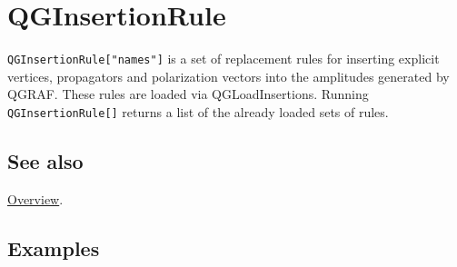 \documentclass[../FeynHelpersManual.tex]{subfiles}
\begin{document}
\hypertarget{qginsertionrule}{
\section{QGInsertionRule}\label{qginsertionrule}}

\texttt{QGInsertionRule[\allowbreak{}"names"]} is a set of replacement
rules for inserting explicit vertices, propagators and polarization
vectors into the amplitudes generated by QGRAF. These rules are loaded
via QGLoadInsertions. Running \texttt{QGInsertionRule[\allowbreak{}]}
returns a list of the already loaded sets of rules.

\subsection{See also}

\hyperlink{toc}{Overview}.

\subsection{Examples}
\end{document}
